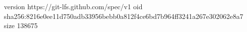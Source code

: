 version https://git-lfs.github.com/spec/v1
oid sha256:8216e0ee11d750adb33956bebb0a812f4ce6bd7b964ff3241a267e302062e8a7
size 138675
